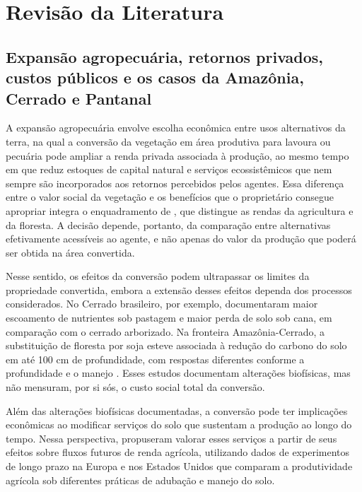 \section{Revisão da Literatura}
\label{sec:literatura}


\subsection{Expansão agropecuária, retornos privados, custos públicos e os casos da Amazônia, Cerrado e Pantanal}

A expansão agropecuária envolve escolha econômica entre usos alternativos da terra, na qual a conversão da vegetação em área produtiva para lavoura ou pecuária pode ampliar a renda privada associada à produção, ao mesmo tempo em que reduz estoques de capital natural e serviços ecossistêmicos que nem sempre são incorporados aos retornos percebidos pelos agentes. Essa diferença entre o valor social da vegetação e os benefícios que o proprietário consegue apropriar integra o enquadramento de , que distingue as rendas da agricultura e da floresta. A decisão depende, portanto, da comparação entre alternativas efetivamente acessíveis ao agente, e não apenas do valor da produção que poderá ser obtida na área convertida.

Nesse sentido, os efeitos da conversão podem ultrapassar os limites da propriedade convertida, embora a extensão desses efeitos dependa dos processos considerados. No Cerrado brasileiro, por exemplo,  documentaram maior escoamento de nutrientes sob pastagem e maior perda de solo sob cana, em comparação com o cerrado arborizado. Na fronteira Amazônia-Cerrado, a substituição de floresta por soja esteve associada à redução do carbono do solo em até 100 cm de profundidade, com respostas diferentes conforme a profundidade e o manejo \cite{Popin2025}. Esses estudos documentam alterações biofísicas, mas não mensuram, por si sós, o custo social total da conversão.

Além das alterações biofísicas documentadas, a conversão pode ter implicações econômicas ao modificar serviços do solo que sustentam a produção ao longo do tempo. Nessa perspectiva,  propuseram valorar esses serviços a partir de seus efeitos sobre fluxos futuros de renda agrícola, utilizando dados de experimentos de longo prazo na Europa e nos Estados Unidos que comparam a produtividade agrícola sob diferentes práticas de adubação e manejo do solo.

